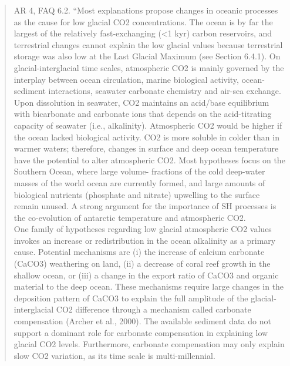 \begin{quotation}
	AR 4, FAQ 6.2.  ``Most explanations propose changes in oceanic processes as the cause for low glacial CO2 concentrations. The ocean is by far the largest of the relatively fast-exchanging (<1 kyr) carbon reservoirs, and terrestrial changes cannot explain the low glacial values because terrestrial storage was also low at the Last Glacial Maximum (see Section 6.4.1). On glacial-interglacial time scales, atmospheric CO2 is mainly governed by the interplay between ocean circulation, marine biological activity, ocean-sediment interactions, seawater carbonate chemistry and air-sea exchange. Upon dissolution in seawater, CO2 maintains an acid/base equilibrium with bicarbonate and carbonate ions that depends on the acid-titrating capacity of seawater (i.e., alkalinity). Atmospheric CO2 would be higher if the ocean lacked biological activity. CO2 is more soluble in colder than in warmer waters; therefore, changes in surface and deep ocean temperature have the potential to alter atmospheric CO2. Most hypotheses focus on the Southern Ocean, where large volume- fractions of the cold deep-water masses of the world ocean are currently formed, and large amounts of biological nutrients (phosphate and nitrate) upwelling to the surface remain unused. A strong argument for the importance of SH processes is the co-evolution of antarctic temperature and atmospheric CO2.\\
	One family of hypotheses regarding low glacial atmospheric CO2 values invokes an increase or redistribution in the ocean alkalinity as a primary cause. Potential mechanisms are (i) the increase of calcium carbonate (CaCO3) weathering on land, (ii) a decrease of coral reef growth in the shallow ocean, or (iii) a change in the export ratio of CaCO3 and organic material to the deep ocean. These mechanisms require large changes in the deposition pattern of CaCO3 to explain the full amplitude of the glacial-interglacial CO2 difference through a mechanism called carbonate compensation (Archer et al., 2000). The available sediment data do not support a dominant role for carbonate compensation in explaining low glacial CO2 levels. Furthermore, carbonate compensation may only explain slow CO2 variation, as its time scale is multi-millennial.\\

\end{quotation}
